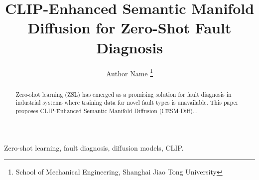 \documentclass[journal,twocolumn]{IEEEtran}
\begin{document}
\title{CLIP-Enhanced Semantic Manifold Diffusion for Zero-Shot Fault Diagnosis}

\author{Author Name%
\thanks{School of Mechanical Engineering, Shanghai Jiao Tong University}%
}

\begin{abstract}
Zero-shot learning (ZSL) has emerged as a promising solution for fault diagnosis in industrial systems where training data for novel fault types is unavailable. This paper proposes CLIP-Enhanced Semantic Manifold Diffusion (CESM-Diff)...
\end{abstract}

\begin{IEEEkeywords}
Zero-shot learning, fault diagnosis, diffusion models, CLIP.
\end{IEEEkeywords}

















\end{document}
